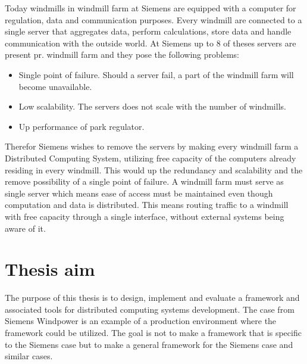 Today windmills in windmill farm at Siemens are equipped with a computer for regulation, data and communication purposes. Every windmill are connected to a single server that aggregates data, perform calculations, store data and handle communication with the outside world. At Siemens up to 8 of theses servers are present pr. windmill farm and they pose the following problems:
\begin{itemize} 
	\item Single point of failure. Should a server fail, a part of the windmill farm will become unavailable.
	\item Low scalability. The servers does not scale with the number of windmills.
	\item Up performance of park regulator.
\end{itemize}

Therefor Siemens wishes to remove the servers by making every windmill farm a Distributed Computing System, utilizing free capacity of the computers already residing in every windmill. This would up the redundancy and scalability and the remove possibility of a single point of failure. A windmill farm must serve as single server which means ease of access must be maintained even though computation and data is distributed. This means routing traffic to a windmill with free capacity through a single interface, without external systems being aware of it.




\section{Thesis aim}

The purpose of this thesis is to design, implement and evaluate a framework and associated tools for distributed computing systems development. The case from Siemens Windpower is an example of a production environment where the framework could be utilized. The goal is not to make a framework that is specific to the Siemens case but to make a general framework for the Siemens case and similar cases. 

